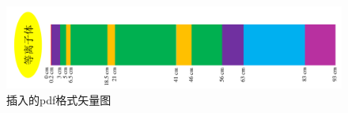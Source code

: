 \begin{figure}[H] %
	\centering
	\includegraphics[width=1\textwidth]{image/chap03/tbm_layer.pdf}
	\caption{插入的pdf格式矢量图}
	\label{fig:tbm_layer}
\end{figure}